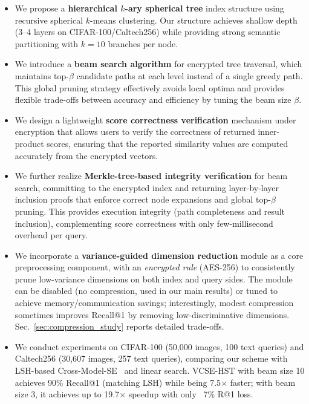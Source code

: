 \documentclass[journal]{IEEEtran}
\begin{document}
\begin{itemize}
    \item We propose a \textbf{hierarchical $k$-ary spherical tree} index structure using recursive spherical $k$-means clustering. Our structure achieves shallow depth (3--4 layers on CIFAR-100/Caltech256) while providing strong semantic partitioning with $k=10$ branches per node.

    \item We introduce a \textbf{beam search algorithm} for encrypted tree traversal, which maintains top-$\beta$ candidate paths at each level instead of a single greedy path. This global pruning strategy effectively avoids local optima and provides flexible trade-offs between accuracy and efficiency by tuning the beam size $\beta$.

    \item We design a lightweight \textbf{score correctness verification} mechanism under encryption that allows users to verify the correctness of returned inner-product scores, ensuring that the reported similarity values are computed accurately from the encrypted vectors.

    \item We further realize \textbf{Merkle-tree-based integrity verification} for beam search, committing to the encrypted index and returning layer-by-layer inclusion proofs that enforce correct node expansions and global top-$\beta$ pruning. This provides execution integrity (path completeness and result inclusion), complementing score correctness with only few-millisecond overhead per query.

    \item We incorporate a \textbf{variance-guided dimension reduction} module as a core preprocessing component, with an \emph{encrypted rule} (AES-256) to consistently prune low-variance dimensions on both index and query sides. The module can be disabled (no compression, used in our main results) or tuned to achieve memory/communication savings; interestingly, modest compression sometimes improves Recall@1 by removing low-discriminative dimensions. Sec.~\ref{sec:compression_study} reports detailed trade-offs.

    \item We conduct experiments on CIFAR-100 (50{,}000 images, 100 text queries) and Caltech256 (30{,}607 images, 257 text queries), comparing our scheme with LSH-based Cross-Model-SE~\cite{yang2025secure} and linear search. VCSE-HST with beam size 10 achieves 90\% Recall@1 (matching LSH) while being 7.5$\times$ faster; with beam size 3, it achieves up to 19.7$\times$ speedup with only ~7\% R@1 loss.
\end{itemize}
\end{document}
